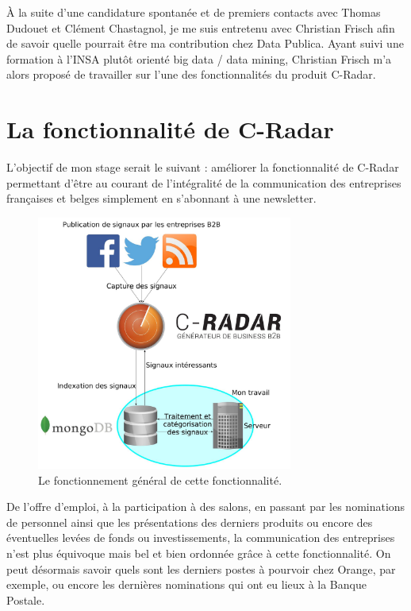 À la suite d'une candidature spontanée et de premiers contacts avec Thomas Dudouet et Clément Chastagnol, je me suis entretenu avec Christian Frisch afin de savoir quelle pourrait être ma contribution chez Data Publica. Ayant suivi une formation à l'INSA plutôt orienté big data / data mining, Christian Frisch m'a alors proposé de travailler sur l'une des fonctionnalités du produit C-Radar.

\section{La fonctionnalité de C-Radar} %
\label{sec:la_fonctionnalite_de_c_radar}
    L'objectif de mon stage serait le suivant : améliorer la fonctionnalité de C-Radar permettant d'être au courant de l'intégralité de la communication des entreprises françaises et belges simplement en s'abonnant à une newsletter.\\

    \begin{figure}[h!]
        \centering
        \includegraphics[width=0.75\textwidth]{images/capture_process.jpg}
        \caption{Le fonctionnement général de cette fonctionnalité.}
        \label{fig:capture_process}
    \end{figure}

    De l'offre d'emploi, à la participation à des salons, en passant par les nominations de personnel ainsi que les présentations des derniers produits ou encore des éventuelles levées de fonds ou investissements, la communication des entreprises n'est plus équivoque mais bel et bien ordonnée grâce à cette fonctionnalité. On peut désormais savoir quels sont les derniers postes à pourvoir chez Orange, par exemple, ou encore les dernières nominations qui ont eu lieux à la Banque Postale.\\

